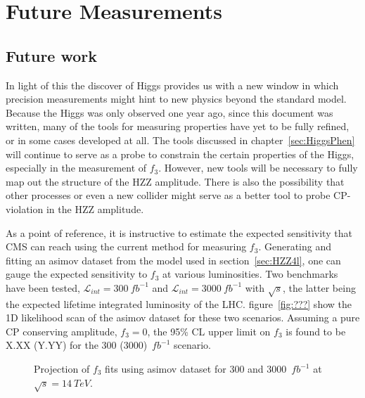 

\chapter{Future Measurements}
\label{sec:FutureMeasurements}

\section{Future work}

In light of this the discover of Higgs provides us with a new 
window in which precision measurements might hint to new physics
beyond the standard model.  Because the Higgs was only observed
one year ago, since this document was written, many of the tools
for measuring properties have yet to be fully refined, or in some
cases developed at all.  The tools discussed in 
chapter~\ref{sec:HiggsPhen} will continue to serve as a probe to 
constrain the certain properties of the Higgs, especially in the
measurement of $f_3$.  However, new tools will be necessary to 
fully map out the structure of the HZZ amplitude.  There is 
also the possibility that other processes or even a new collider 
might serve as a better tool to probe CP-violation in the HZZ 
amplitude.  

As a point of reference, it is instructive to estimate the
expected sensitivity that CMS can reach using the current method
for measuring $f_3$.  Generating and fitting an asimov dataset
from the model used in section~\ref{sec:HZZ4l}, one can gauge
the expected sensitivity to $f_3$ at various luminosities.  
Two benchmarks have been tested, $\mathscr{L}_{int}=300~fb^{-1}$
 and $\mathscr{L}_{int}=3000~fb^{-1}$ with $\sqrt{s}$, the latter
being the expected lifetime integrated luminosity of the LHC. 
figure~\ref{fig:???} show the 1D likelihood scan of the asimov
dataset for these two scenarios.  Assuming a pure CP conserving 
amplitude, $f_3=0$, the 95\% CL upper limit on $f_3$ is found to
be X.XX (Y.YY) for the 300 (3000)~$fb^{-1}$ scenario.  

\begin{figure}
\begin{center}
\label{fig:fa3Projections}
\caption{Projection of $f_3$ fits using asimov dataset for 
300 and 3000~$fb^{-1}$ at $\sqrt{s}=14~TeV$.}
\end{center}
\end{figure}

